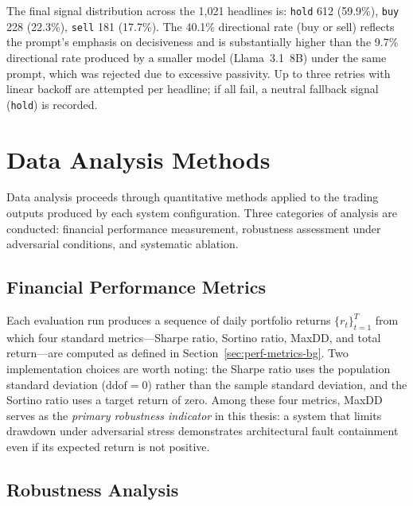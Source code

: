 The final signal distribution across the 1{,}021 headlines is: \texttt{hold}
612 (59.9\%), \texttt{buy} 228 (22.3\%), \texttt{sell} 181 (17.7\%). The 40.1\%
directional rate (buy or sell) reflects the prompt's emphasis on decisiveness
and is substantially higher than the 9.7\% directional rate produced by a
smaller model (Llama~3.1~8B) under the same prompt, which was rejected due to
excessive passivity. Up to three retries with linear backoff are attempted per
headline; if all fail, a neutral fallback signal (\texttt{hold}) is recorded.


\section{Data Analysis Methods} \label{sec:data_analysis}

Data analysis proceeds through quantitative methods applied to the trading
outputs produced by each system configuration. Three categories of analysis are
conducted: financial performance measurement, robustness assessment under
adversarial conditions, and systematic ablation.

\subsection{Financial Performance Metrics} \label{sec:financial_metrics}

Each evaluation run produces a sequence of daily portfolio returns
$\{r_t\}_{t=1}^{T}$ from which four standard metrics---Sharpe ratio,
Sortino ratio, MaxDD, and total return---are computed as
defined in Section~\ref{sec:perf-metrics-bg}. Two implementation choices
are worth noting: the Sharpe ratio uses the population standard deviation
($\text{ddof} = 0$) rather than the sample standard deviation, and the
Sortino ratio uses a target return of zero. Among these four metrics, MaxDD
serves as the \emph{primary robustness indicator} in this thesis: a system
that limits drawdown under adversarial stress demonstrates architectural
fault containment even if its expected return is not positive.

\subsection{Robustness Analysis} \label{sec:robustness_analysis}

